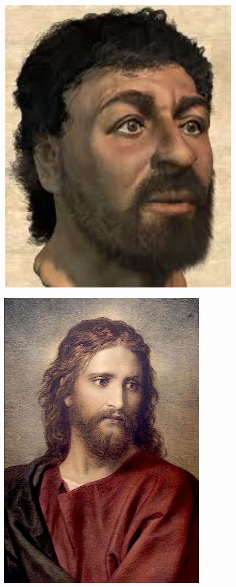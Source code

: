 \begin{minipage}[t]{0.49\textwidth}
\centering
\includegraphics[scale=0.5]{graphics/jesus.PNG}
\end{minipage}
\begin{minipage}[t]{0.49\textwidth}
\centering
\includegraphics[scale=0.5]{graphics/jesus_c.PNG}
\end{minipage}